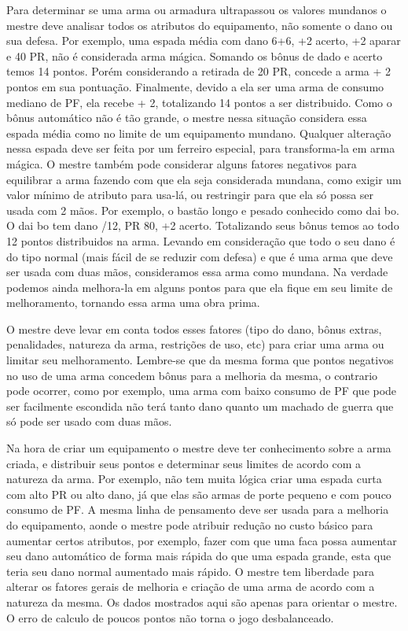 Para determinar se uma arma ou armadura ultrapassou os valores mundanos o mestre deve analisar todos os atributos do equipamento, não somente o dano ou sua defesa. Por exemplo, uma espada média com dano 6+6, +2 acerto, +2 aparar e 40 PR, não é considerada arma mágica. Somando os bônus de dado e acerto temos 14 pontos. Porém considerando a retirada de 20 PR, concede a arma + 2 pontos em sua pontuação. Finalmente, devido a ela ser uma arma de consumo mediano de PF, ela recebe + 2, totalizando 14 pontos a ser distribuido. Como o bônus automático não é tão grande, o mestre nessa situação considera essa espada média como no limite de um equipamento mundano. Qualquer alteração nessa espada deve ser feita por um ferreiro especial, para transforma-la em arma mágica. O mestre também pode considerar alguns fatores negativos para equilibrar a arma fazendo com que ela seja considerada mundana, como exigir um valor mínimo de atributo para usa-lá, ou restringir para que ela só possa ser usada com 2 mãos. Por exemplo, o bastão longo e pesado conhecido como dai bo. O dai bo tem dano /12, PR 80, +2 acerto. Totalizando seus bônus temos ao todo 12 pontos distribuidos na arma. Levando em consideração que todo o seu dano é do tipo normal (mais fácil de se reduzir com defesa) e que é uma arma que deve ser usada com duas mãos, consideramos essa arma como mundana. Na verdade podemos ainda melhora-la em alguns pontos para que ela fique em seu limite de melhoramento, tornando essa arma uma obra prima. 

O mestre deve levar em conta todos esses fatores (tipo do dano, bônus extras, penalidades, natureza da arma, restrições de uso, etc) para criar uma arma ou limitar seu melhoramento. Lembre-se que da mesma forma que pontos negativos no uso de uma arma concedem bônus para a melhoria da mesma, o contrario pode ocorrer, como por exemplo, uma arma com baixo consumo de PF que pode ser facilmente escondida não terá tanto dano quanto um machado de guerra que só pode ser usado com duas mãos.	


Na hora de criar um equipamento o mestre deve ter conhecimento sobre a arma criada, e distribuir seus pontos e determinar seus limites de acordo com a natureza da arma. Por exemplo, não tem muita lógica criar uma espada curta com alto PR ou alto dano, já que elas são armas de porte pequeno e com pouco consumo de PF. A mesma linha de pensamento deve ser usada para a melhoria do equipamento, aonde o mestre pode atribuir redução no custo básico para aumentar certos atributos, por exemplo, fazer com que uma faca possa aumentar seu dano automático de forma mais rápida do que uma espada grande, esta que teria seu dano normal aumentado mais rápido. O mestre tem liberdade para alterar os fatores gerais de melhoria e criação de uma arma de acordo com a natureza da mesma. Os dados mostrados aqui são apenas para orientar o mestre. O erro de calculo de poucos pontos não torna o jogo desbalanceado.


